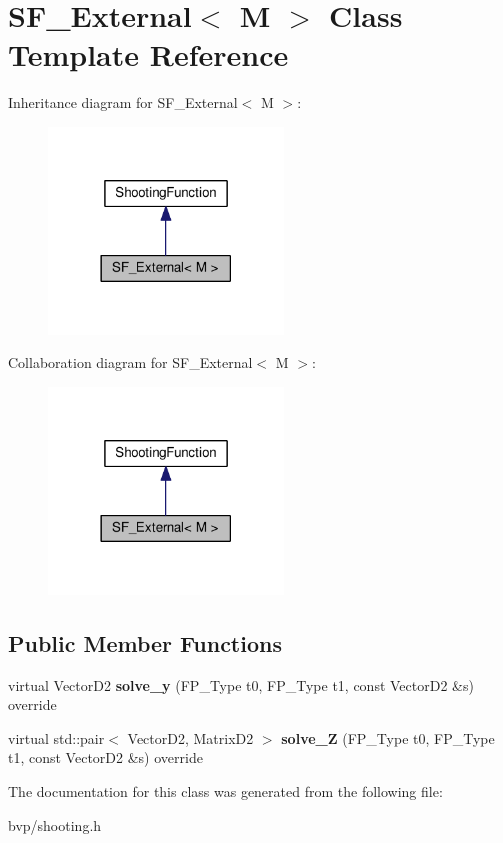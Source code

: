 \hypertarget{classSF__External}{}\section{S\+F\+\_\+\+External$<$ M $>$ Class Template Reference}
\label{classSF__External}


Inheritance diagram for S\+F\+\_\+\+External$<$ M $>$\+:
\nopagebreak
\begin{figure}[H]
\begin{center}
\leavevmode
\includegraphics[width=177pt]{classSF__External__inherit__graph}
\end{center}
\end{figure}


Collaboration diagram for S\+F\+\_\+\+External$<$ M $>$\+:
\nopagebreak
\begin{figure}[H]
\begin{center}
\leavevmode
\includegraphics[width=177pt]{classSF__External__coll__graph}
\end{center}
\end{figure}
\subsection*{Public Member Functions}
\begin{DoxyCompactItemize}
\item 
\mbox{\label{classSF__External_a4c59ab31f0bb2ab9663b5137655a6266}} 
virtual Vector\+D2 {\bfseries solve\+\_\+y} (F\+P\+\_\+\+Type t0, F\+P\+\_\+\+Type t1, const Vector\+D2 \&s) override
\item 
\mbox{\label{classSF__External_a72c762001bc0a4bc43ac82aba45ad3ba}} 
virtual std\+::pair$<$ Vector\+D2, Matrix\+D2 $>$ {\bfseries solve\+\_\+Z} (F\+P\+\_\+\+Type t0, F\+P\+\_\+\+Type t1, const Vector\+D2 \&s) override
\end{DoxyCompactItemize}


The documentation for this class was generated from the following file\+:\begin{DoxyCompactItemize}
\item 
bvp/shooting.\+h\end{DoxyCompactItemize}
